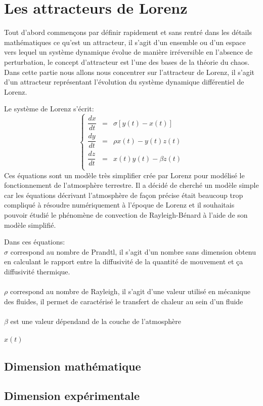 \chapter{Les attracteurs de Lorenz}
Tout d’abord commençons par définir rapidement et sans rentré dans les détails mathématiques ce qu’est un attracteur,
 il s’agit d’un ensemble ou d’un espace vers lequel un système dynamique évolue de manière
 irréversible en l’absence de perturbation, le concept d’attracteur est l’une des bases de la théorie du chaos. 
 Dans cette partie nous allons nous concentrer sur l’attracteur de Lorenz, il s’agit d’un attracteur
représentant l’évolution du système dynamique différentiel de Lorenz.

Le système de Lorenz s'écrit: 
\[
    \left\{
    \begin{array}{rcl}
        \dfrac{dx}{dt}&=&\sigma[y(t)-x(t)]\\
        \dfrac{dy}{dt}&=&\rho x(t)-y(t)z(t)\\
        \dfrac{dz}{dt}&=&x(t)y(t)-\beta z(t)\\
    \end{array}
    \right.
\]
Ces équations sont un modèle très simplifier crée par Lorenz pour modélisé le fonctionnement 
de l’atmosphère terrestre. Il a décidé de cherché un modèle simple car 
les équations décrivant l’atmosphère de façon précise était beaucoup trop compliqué à résoudre
 numériquement à l’époque de Lorenz et il souhaitais pouvoir étudié  le phénomène de convection
de Rayleigh-Bénard à l’aide de son modèle simplifié.

Dans ces équations: \\
$\sigma$  correspond au nombre de Prandtl, il s'agit d'un nombre sans dimension obtenu en calculant le rapport entre la diffusivité de la quantité de mouvement et ça diffusivité thermique.\\\\
$\rho$    correspond au nombre de Rayleigh, il s'agit d'une valeur utilisé en mécanique des fluides, il permet de caractérisé le transfert de chaleur au sein d'un fluide \\\\
$\beta $  est une valeur dépendand de la couche de l'atmosphère\\\\
$x(t)$    

\section{Dimension mathématique}

\section{Dimension expérimentale}
